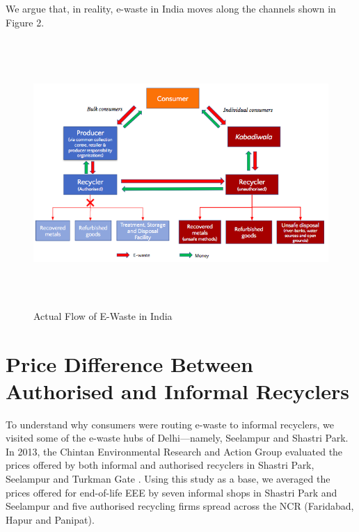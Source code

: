 \documentclass[a4paper, 12pt]{article}
\begin{document}
                    We argue that, in reality, e-waste in India moves along the channels shown in Figure 2. \\
                    
                    \begin{figure}[H]
                    	\centering
                    	\includegraphics[height = 4in]{fig2.png}
                    	\caption[Optional Caption]{Actual Flow of E-Waste in India}
                    \end{figure}
                    
                    \section{Price Difference Between Authorised and Informal Recyclers}\label{sec:3}
                    
                    To understand why consumers were routing e-waste to informal recyclers, we visited some of the e-waste hubs of Delhi—namely, Seelampur and Shastri Park.\\
                     
                     In 2013, the Chintan Environmental Research and Action Group evaluated the prices offered by both informal and authorised recyclers in Shastri Park, Seelampur and Turkman Gate \parencite{chintanreport}. Using this study as a base, we averaged the prices offered for end-of-life EEE by seven informal shops in Shastri Park and Seelampur and five authorised recycling firms spread across the NCR (Faridabad, Hapur and Panipat).\\
                     
\end{document}
